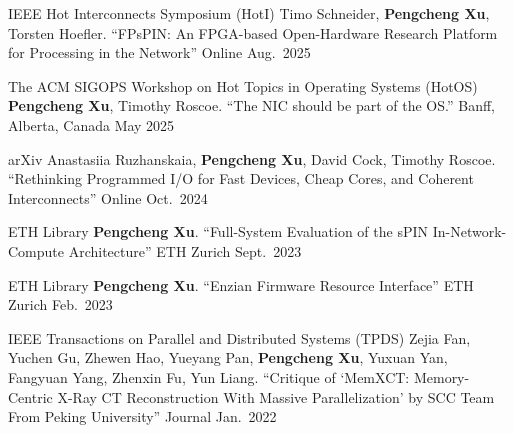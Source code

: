 


\begin{cventries}

  \cventry
    {IEEE Hot Interconnects Symposium (HotI)}
    {{\normalfont Timo Schneider, \textbf{Pengcheng Xu}, Torsten Hoefler. ``FPsPIN: An FPGA-based Open-Hardware Research Platform for Processing in the Network''}}
    {Online} %
    {Aug.\ 2025} %
    {}

  \cventry
    {The ACM SIGOPS Workshop on Hot Topics in Operating Systems (HotOS)}
    {{\normalfont \textbf{Pengcheng Xu}, Timothy Roscoe. ``The NIC should be part of the OS.''}}
    {Banff, Alberta, Canada} %
    {May 2025} %
    {}

  \cventry
    {arXiv}
    {{\normalfont Anastasiia Ruzhanskaia, \textbf{Pengcheng Xu}, David Cock, Timothy Roscoe. ``Rethinking Programmed I/O for Fast Devices, Cheap Cores, and Coherent Interconnects''}}
    {Online} %
    {Oct.\ 2024} %
    {}

  \cventry
    {ETH Library}
    {{\normalfont \textbf{Pengcheng Xu}. ``Full-System Evaluation of the sPIN In-Network-Compute Architecture''}}
    {ETH Zurich} %
    {Sept.\ 2023} %
    {}

  \cventry
    {ETH Library}
    {{\normalfont \textbf{Pengcheng Xu}. ``Enzian Firmware Resource Interface''}}
    {ETH Zurich} %
    {Feb.\ 2023} %
    {}

  \cventry
    {IEEE Transactions on Parallel and Distributed Systems (TPDS)}
    {{\normalfont Zejia Fan, Yuchen Gu, Zhewen Hao, Yueyang Pan, \textbf{Pengcheng Xu}, Yuxuan Yan, Fangyuan Yang, Zhenxin Fu, Yun Liang. ``Critique of `MemXCT: Memory-Centric X-Ray CT Reconstruction With Massive Parallelization' by SCC Team From Peking University''}}
    {Journal} %
    {Jan.\ 2022} %
    {}


\end{cventries}
